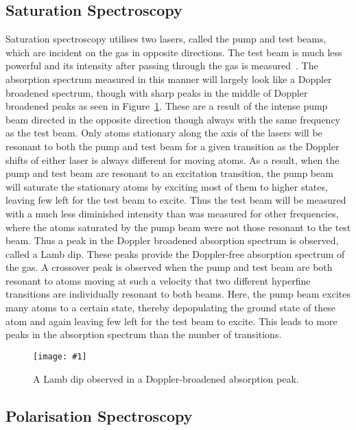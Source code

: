 \documentclass[twocolumn]{article}
\newcommand{\insertFigure}[1]{%
   \texttt{[image: \#1]}%
}
\begin{document}
\subsection{Saturation Spectroscopy}
Saturation spectroscopy utilises two lasers, called the pump and test beams, which are incident on the gas in opposite directions. The test beam is much less powerful and its intensity after passing through the gas is measured~\cite{manual}. The absorption spectrum measured in this manner will largely look like a Doppler broadened spectrum, though with sharp peaks in the middle of Doppler broadened peaks as seen in Figure~\ref{fig:Lamb}. These are a result of the intense pump beam directed in the opposite direction though always with the same frequency as the test beam. Only atoms stationary along the axis of the lasers will be resonant to both the pump and test beam for a given transition as the Doppler shifts of either laser is always different for moving atoms. As a result, when the pump and test beam are resonant to an excitation transition, the pump beam will saturate the stationary atoms by exciting most of them to higher states, leaving few left for the test beam to excite. Thus the test beam will be measured with a much less diminished intensity than was measured for other frequencies, where the atoms saturated by the pump beam were not those resonant to the test beam. Thus a peak in the Doppler broadened absorption spectrum is observed, called a Lamb dip. These peaks provide the Doppler-free absorption spectrum of the gas. A crossover peak is observed when the pump and test beam are both resonant to atoms moving at such a velocity that two different hyperfine transitions are individually resonant to both beams. Here, the pump beam excites many atoms to a certain state, thereby depopulating the ground state of these atom and again leaving few left for the test beam to excite. This leads to more peaks in the absorption spectrum than the number of transitions.
\begin{figure} [!h]
	\centering
	\insertFigure{Images/Lamb.png}
	\caption{A Lamb dip observed in a Doppler-broadened absorption peak.~\cite{manual}}
	\label{fig:Lamb}
\end{figure}

\subsection{Polarisation Spectroscopy}
\end{document}
